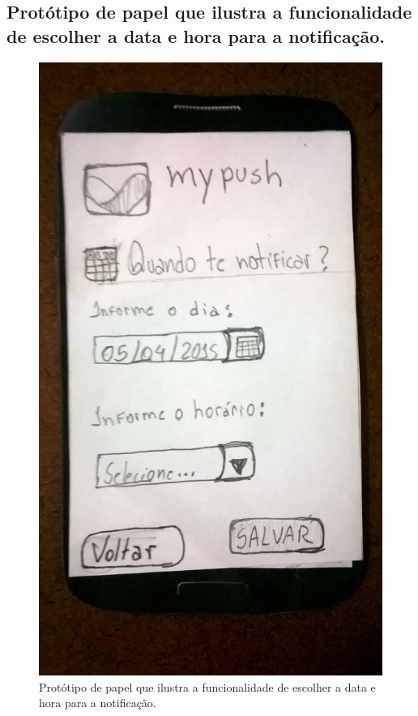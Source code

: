 \begin{anexosenv}
    \pagebreak
    \section*{Protótipo de papel que ilustra a funcionalidade de escolher a data e hora para a notificação.}
    
      \begin{figure}[!htbp]
	\centering
	\includegraphics[scale=0.32, angle=-90]{editaveis/figuras/prototipo_papel_v1/quando_notificar}
	\caption{Protótipo de papel que ilustra a funcionalidade de escolher a data e hora para a notificação.}
	\label{quando_notificar_v1}
      \end{figure}
      

\end{anexosenv}
